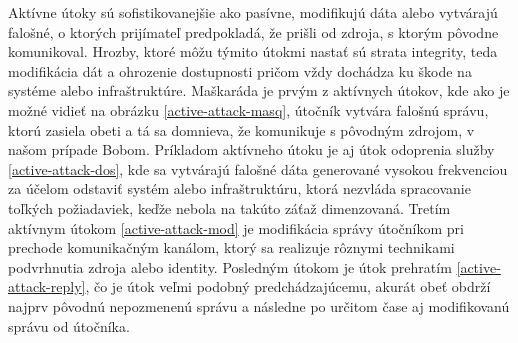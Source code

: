 Aktívne útoky sú sofistikovanejšie ako pasívne, modifikujú dáta alebo vytvárajú falošné, o ktorých prijímateľ predpokladá, že prišli od zdroja, s ktorým pôvodne komunikoval. Hrozby, ktoré môžu týmito útokmi nastať sú strata integrity, teda modifikácia dát a ohrozenie dostupnosti pričom vždy dochádza ku škode na systéme alebo infraštruktúre. Maškaráda je prvým z aktívnych útokov, kde ako je možné vidieť na obrázku \ref{active-attack-masq}, útočník vytvára falošnú správu, ktorú zasiela obeti a tá sa domnieva, že komunikuje s pôvodným zdrojom, v našom prípade Bobom. Príkladom aktívneho útoku je aj útok odoprenia služby \ref{active-attack-dos}, kde sa vytvárajú falošné dáta generované vysokou frekvenciou za účelom odstaviť systém alebo infraštruktúru, ktorá nezvláda spracovanie toľkých požiadaviek, keďže nebola na takúto záťaž dimenzovaná. Tretím aktívnym útokom \ref{active-attack-mod} je modifikácia správy útočníkom pri prechode komunikačným kanálom, ktorý sa realizuje rôznymi technikami podvrhnutia zdroja alebo identity. Posledným útokom je útok prehratím \ref{active-attack-reply}, čo je útok veľmi podobný predchádzajúcemu, akurát obeť obdrží najprv pôvodnú nepozmenenú správu a následne po určitom čase aj modifikovanú správu od útočníka.  




